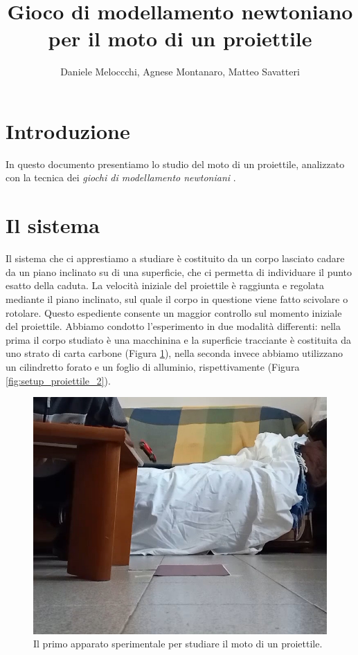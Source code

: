 \documentclass{article}
\title{Gioco di modellamento newtoniano per il moto di un proiettile}
\author{Daniele Meloccchi, Agnese Montanaro, Matteo Savatteri}
\begin{document}
\maketitle

\tableofcontents

\section{Introduzione}
In questo documento presentiamo lo studio del moto di un
proiettile, analizzato con la tecnica dei \emph{giochi di modellamento newtoniani}
\cite{hestenes1992modeling}.

\section{Il sistema}
Il sistema che ci apprestiamo a studiare è costituito da un corpo lasciato cadare da
un piano inclinato su di una superficie, che ci permetta di individuare il 
punto esatto della caduta.  La velocità iniziale del proiettile è raggiunta e
regolata mediante il piano inclinato, sul quale il corpo in questione viene fatto scivolare
o rotolare. Questo espediente consente un maggior controllo sul momento iniziale del
proiettile. Abbiamo condotto l'esperimento in due modalità differenti: nella prima il corpo
studiato è una macchinina e la superficie tracciante è costituita da uno strato di
carta carbone (Figura \ref{fig:setup_proiettile_1}), nella seconda invece abbiamo utilizzano
un cilindretto forato e un foglio di alluminio, rispettivamente
(Figura \ref{fig:setup_proiettile_2}).

\begin{figure}
\centering
  \includegraphics[width=\textwidth]{setup_proiettile_piano_inclinato_1}
  \caption{Il primo apparato sperimentale per studiare il moto di un proiettile.}
  \label{fig:setup_proiettile_1}
\end{figure}
\end{document}

